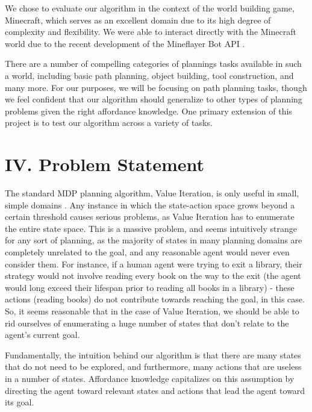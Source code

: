 \documentclass[a4paper]{article}
\begin{document}
We chose to evaluate our algorithm in the context of the world building game, Minecraft, which serves as an excellent domain due to its high degree of complexity and flexibility. We were able to interact directly with the Minecraft world due to the recent development of the Mineflayer Bot API \cite{Mineflayer}. 

There are a number of compelling categories of plannings tasks available in such a world, including basic path planning, object building, tool construction, and many more. For our purposes, we will be focusing on path planning tasks, though we feel confident that our algorithm should generalize to other types of planning problems given the right affordance knowledge. One primary extension of this project is to test our algorithm across a variety of tasks.

\section{IV. Problem Statement}

The standard MDP planning algorithm, Value Iteration, is only useful in small, simple domains \cite{Norvig} \cite{Grounds2005}. Any instance in which the state-action space grows beyond a certain threshold causes serious problems, as Value Iteration has to enumerate the entire state space. This is a massive problem, and seems intuitively strange for any sort of planning, as the majority of states in many planning domains are completely unrelated to the goal, and any reasonable agent would never even consider them. For instance, if a human agent were trying to exit a library, their strategy would not involve reading every book on the way to the exit (the agent would long exceed their lifespan prior to reading all books in a library) - these actions (reading books) do not contribute towards reaching the goal, in this case. So, it seems reasonable that in the case of Value Iteration, we should be able to rid ourselves of enumerating a huge number of states that don't relate to the agent's current goal.

Fundamentally, the intuition behind our algorithm is that there are many states that do not need to be explored, and furthermore, many actions that are useless in a number of states. Affordance knowledge capitalizes on this assumption by directing the agent toward relevant states and actions that lead the agent toward its goal.
\end{document}
